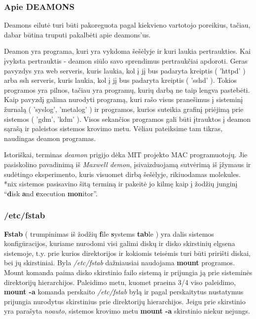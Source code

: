 \subsubsection{Apie DEAMONS}

Deamons eilutė turi būti pakoreguota pagal kiekvieno vartotojo
poreikius, tačiau, dabar būtina truputi pakalbėti apie deamons'us. 

Deamon yra programa, kuri yra vykdoma šešėlyje ir kuri laukia
pertraukties. Kai įvyksta pertrauktis - deamon siūlo savo sprendimus
pertraukčiai apdoroti. Geras pavyzdys yra web serveris, kuris laukia,
kol į jį bus padaryta kreiptis ( 'httpd' ) arba ssh serveris, kuris
laukia, kol į jį bus padaryta kreiptis ( 'sshd' ). Tokios programos
yra pilnos, tačiau yra programų, kurių darbą ne taip lengva
pastebėti. Kaip pavyzdį galima nurodyti programą, kuri rašo visus
pranešimus į sisteminį žurnalą ( 'syslog', 'metalog' ) ir programos,
kurios suteikia grafinį priėjimą prie sistemos ( 'gdm', 'kdm' ). Visos
sekančios programos gali būti įtrauktos į deamon sąrašą ir paleistos
sistemos krovimo metu. Vėliau pateiksime tam tikras, naudingas deamon
programas. 

Istoriškai, terminas \textsl{deamon} prigijo dėka MIT projekto MAC
programuotojų. Jie pasiskolino pavadinimą iš \textsl{Maxwell demon},
įsivaizduojamą sutvėrimą iš įžymaus ir sudėtingo eksperimento, kuris
visuomet dirbą šešėlyje, rikiuodamas molekules. *nix sistemos
pasisavino šitą terminą ir pakeitė jo kilmę kaip į žodžių junginį
``\textbf{d}isk \textbf{a}nd \textbf{e}xecution \textbf{mon}itor''.


\subsubsection{/etc/fstab}

\textbf{Fstab} ( trumpinimas iš žodžių \textbf{f}ile \textbf{s}ystems
\textbf{tab}le ) yra dalis sistemos konfigūracijos, kuriame nurodomi
visi galimi diskų ir disko skirstinių elgsena sistemoje, t.y. prie
kurios direktorijos ir kokiomis teisėmis turi būti pririšti diskai,
bei jų skirstiniai. Byla \textsl{/etc/fstab} dažniausiai naudojama
\textbf{mount} programos. Mount komanda paima disko skirstinio failo
sistemą ir prijungia ją prie sisteminės direktorijų
hierarchijos. Paleidimo metu, kuomet praeina 3/4 viso paleidimo,
\textbf{mount -a} komanda perskaito \textsl{/etc/fstab} bylą ir pagal
perskaitytus nustatymus prijungia nurodytus skirstinius prie
direktorijų hierarchijos. Jeigu prie skirstinio yra parašyta
\textsl{noauto}, sistemos krovimo metu \textbf{mount -a} skirstinio
niekur nejungs.

